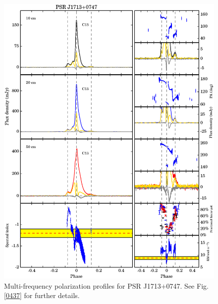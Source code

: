 \documentclass[useAMS,usenatbib]{mn2e}
\begin{document}
\begin{appendix}
\begin{figure}
\begin{center}
\includegraphics[width=6 in]{1713.ps}
\caption{Multi-frequency polarization profiles for PSR J1713$+$0747. 
See Fig. \ref{0437} for further details.}
\label{1713}
\end{center}
\end{figure}


\end{appendix}
\end{document}
